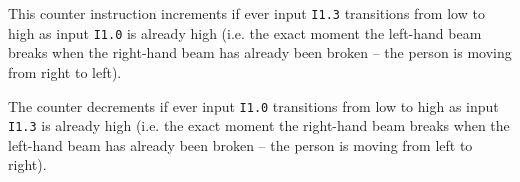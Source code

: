 





This counter instruction increments if ever input {\tt I1.3} transitions from low to high as input {\tt I1.0} is already high (i.e. the exact moment the left-hand beam breaks when the right-hand beam has already been broken -- the person is moving from right to left).

\vskip 10pt

The counter decrements if ever input {\tt I1.0} transitions from low to high as input {\tt I1.3} is already high (i.e. the exact moment the right-hand beam breaks when the left-hand beam has already been broken -- the person is moving from left to right).




